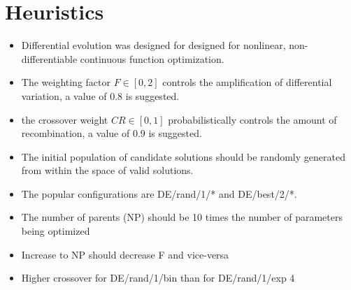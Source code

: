\documentclass[a4paper, 11pt]{article}
\begin{document}
\section{Heuristics}
\label{sec:heuristics}
\begin{itemize}
	\item Differential evolution was designed for designed for nonlinear, non-differentiable continuous function optimization.
	\item The weighting factor $F \in [0,2]$ controls the amplification of differential variation, a value of 0.8 is suggested.
	\item the crossover weight $CR \in [0,1]$ probabilistically controls the amount of recombination, a value of 0.9 is suggested.
	\item The initial population of candidate solutions should be randomly generated from within the space of valid solutions.
	\item The popular configurations are DE/rand/1/* and DE/best/2/*. 
	
	
	\item The number of parents (NP) should be 10 times the number of parameters being optimized
	\item Increase to NP should decrease F and vice-versa
	\item Higher crossover for DE/rand/1/bin than for DE/rand/1/exp
	4
	
\end{itemize}

\end{document}
